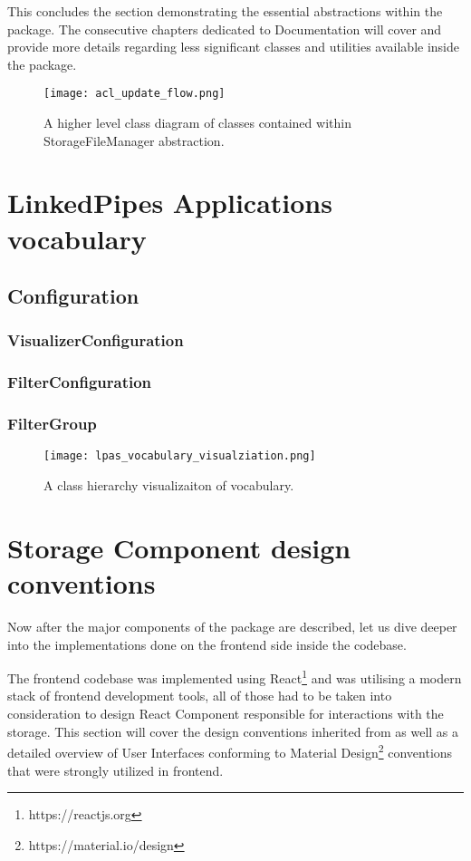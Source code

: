 This concludes the section demonstrating the essential abstractions within the \lpas{} package. The consecutive chapters dedicated to Documentation will cover and provide more details regarding less significant classes and utilities available inside the package.

\begin{figure}[h]
\centering
\texttt{[image: acl\_update\_flow.png]}
\caption{A higher level class diagram of classes contained within StorageFileManager abstraction.}
\label{fig:lps_acl_update_flow}
\end{figure}


\section{LinkedPipes Applications vocabulary}

\subsection{Configuration}
\subsubsection{VisualizerConfiguration}
\subsubsection{FilterConfiguration}
\subsubsection{FilterGroup}


\begin{figure}[h]
\centering
\texttt{[image: lpas\_vocabulary\_visualziation.png]}
\caption{A class hierarchy visualizaiton of \lpa{} vocabulary.}
\label{fig:lpas_vocabulary_visualziation}
\end{figure}

\section{Storage Component design conventions}

Now after the major components of the \lpas{} package are described, let us dive deeper into the implementations done on the frontend side inside the \lpa{} codebase. 

The \lpa{} frontend codebase was implemented using React\footnote{https://reactjs.org} and was utilising a modern stack of frontend development tools, all of those had to be taken into consideration to design React Component responsible for interactions with the storage. This section will cover the design conventions inherited from \lpa{} as well as a detailed overview of User Interfaces conforming to Material Design\footnote{https://material.io/design} conventions that were strongly utilized in \lpa{} frontend.  

